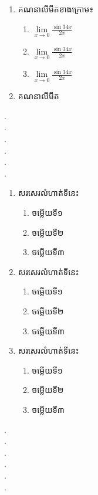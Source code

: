 \documentclass[11pt, a5paper]{article}
\begin{document}
\maketitle
{}
\begin{enumerate}[m]
	 \item គណនាលីមីតខាងក្រោម៖
	 \begin{enumerate}[k,3]
	 	\item $\lim\limits_{x\to0}\frac{\sin34x}{2x}$
	 	\item $\lim\limits_{x\to0}\frac{\sin34x}{2x}$
	 	\item $\lim\limits_{x\to0}\frac{\sin34x}{2x}$
	 \end{enumerate}
 	\item គណនាលីមីត
\end{enumerate}
	{\color{magenta}.}\dotfill\\
	{\color{magenta}.}\dotfill\\
	{\color{magenta}.}\dotfill\\
	{\color{magenta}.}\dotfill\\
	{\color{magenta}.}\dotfill\\
	{\color{magenta}.}\dotfill\\
\newpage
\maketitle
{}
\begin{enumerate}[m]
	\item សរសេរលំហាត់ទីនេះ
	\begin{enumerate}[k,3]
		\item ចម្លើយទី១
		\item ចម្លើយទី២
		\item ចម្លើយទី៣
	\end{enumerate}
	\item សរសេរលំហាត់ទីនេះ
	\begin{enumerate}[k,3]
		\item ចម្លើយទី១
		\item ចម្លើយទី២
		\item ចម្លើយទី៣
	\end{enumerate}
	\item សរសេរលំហាត់ទីនេះ
	\begin{enumerate}[k,3]
		\item ចម្លើយទី១
		\item ចម្លើយទី២
		\item ចម្លើយទី៣
	\end{enumerate}
\end{enumerate}
	{\color{magenta}.}\dotfill\\
	{\color{magenta}.}\dotfill\\
	{\color{magenta}.}\dotfill\\
	{\color{magenta}.}\dotfill\\
	{\color{magenta}.}\dotfill\\
	{\color{magenta}.}\dotfill\\
\end{document}
